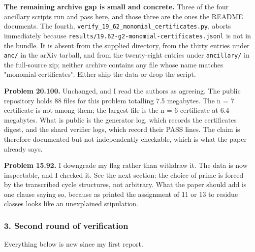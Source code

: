 \textbf{The remaining archive gap is small and concrete.} Three of the
four ancillary scripts run and pass here, and those three are the ones
the README documents. The fourth,
\nolinkurl{verify_19_62_monomial_certificates.py}, aborts immediately
because \nolinkurl{results/19.62-g2-monomial-certificates.jsonl} is not
in the bundle. It is absent from the supplied directory, from the thirty
entries under \nolinkurl{anc/} in the arXiv tarball, and from the
twenty-eight entries under \nolinkurl{ancillary/} in the full-source
zip; neither archive contains any file whose name matches
"monomial-certificates". Either ship the data or drop the script.

\textbf{Problem 20.100.} Unchanged, and I read the authors as agreeing.
The public repository holds 88 files for this problem totalling 7.5
megabytes. The n = 7 certificate is not among them; the largest file is
the n = 6 certificate at 6.4 megabytes. What is public is the generator
log, which records the certificate\textquotesingle s digest, and the
shard verifier logs, which record their PASS lines. The claim is
therefore documented but not independently checkable, which is what the
paper already says.

\textbf{Problem 15.92.} I downgrade my flag rather than withdraw it. The
data is now inspectable, and I checked it. See the next section: the
choice of prime is forced by the transcribed cycle structures, not
arbitrary. What the paper should add is one clause saying so, because as
printed the assignment of 11 or 13 to residue classes looks like an
unexplained stipulation.

\hypertarget{review2-md-second-round-of-verification}{%
\subsubsection*{3. Second round of
verification}\label{review2-md-second-round-of-verification}}

Everything below is new since my first report.

